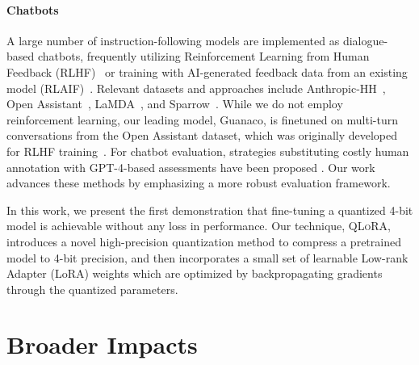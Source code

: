 \paragraph{Chatbots} A large number of instruction-following models are implemented as dialogue-based chatbots, frequently utilizing Reinforcement Learning from Human Feedback (RLHF)~\citep{christiano2017deep} or training with AI-generated feedback data from an existing model (RLAIF)~\citep{bai2022constitutional}. Relevant datasets and approaches include Anthropic-HH~\citep{askell2021general,bai2022training}, Open Assistant~\citep{kopf2023openassistant}, LaMDA~\citep{thoppilan2022lamda}, and Sparrow~\citep{glaese2022improving}. While we do not employ reinforcement learning, our leading model, Guanaco, is finetuned on multi-turn conversations from the Open Assistant dataset, which was originally developed for RLHF training~\citep{kopf2023openassistant}. For chatbot evaluation, strategies substituting costly human annotation with GPT-4-based assessments have been proposed \citep{vicuna2023,peng2023instruction}. Our work advances these methods by emphasizing a more robust evaluation framework.

In this work, we present the first demonstration that fine-tuning a quantized 4-bit model is achievable without any loss in performance. Our technique, \textsc{QLoRA}, introduces a novel high-precision quantization method to compress a pretrained model to 4-bit precision, and then incorporates a small set of learnable Low-rank Adapter (LoRA) weights \citep{hu2021lora} which are optimized by backpropagating gradients through the quantized parameters.

\section{Broader Impacts}

